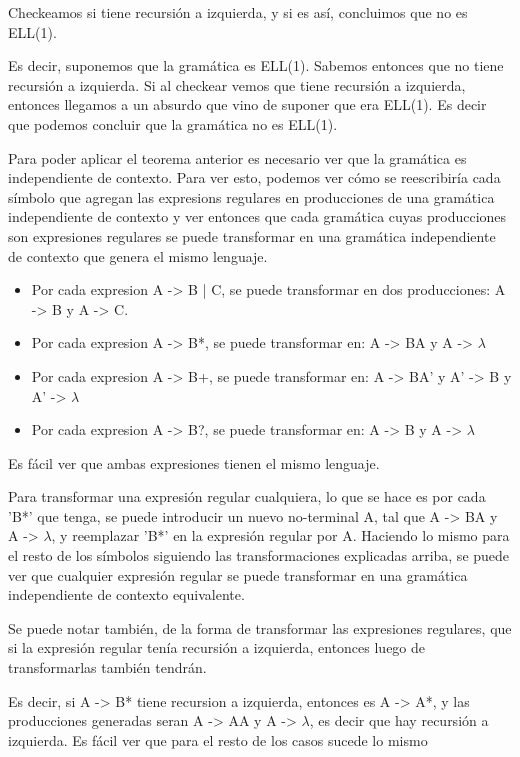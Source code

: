 \documentclass[a4paper]{report}
\begin{document}
Checkeamos si tiene recursión a izquierda, y si es así, concluimos que no es
ELL(1).


Es decir, suponemos que la gramática es ELL(1). Sabemos entonces que no
tiene recursión a izquierda. Si al checkear vemos que tiene recursión a
izquierda, entonces llegamos a un absurdo que vino de suponer que era ELL(1). Es
decir que podemos concluir que la gramática no es ELL(1).


Para poder aplicar el teorema anterior es necesario ver que la gramática es
independiente de contexto. Para ver esto, podemos ver cómo se reescribiría cada
símbolo que agregan las expresions regulares en producciones de una gramática
independiente de contexto y ver entonces que cada gramática cuyas producciones
son expresiones regulares se puede transformar en una gramática independiente de
contexto que genera el mismo lenguaje.

\begin{itemize}
\item Por cada expresion A -> B | C, se puede transformar en dos producciones: A -> B
y A -> C.
\item Por cada expresion A -> B*, se puede transformar en: A -> BA y A -> $\lambda$
\item Por cada expresion A -> B+, se puede transformar en: A -> BA' y A' -> B y A' -> $\lambda$
\item Por cada expresion A -> B?, se puede transformar en: A -> B y A -> $\lambda$
\end{itemize}


Es fácil ver que ambas expresiones tienen el mismo lenguaje.


Para transformar una expresión regular cualquiera, lo que se hace es por cada
'B*' que tenga, se puede introducir un nuevo no-terminal A, tal que A -> BA y A
-> $\lambda$, y reemplazar 'B*' en la expresión regular por A. Haciendo lo mismo para el
resto de los símbolos siguiendo las transformaciones explicadas arriba, se puede
ver que cualquier expresión regular se puede transformar en una gramática
independiente de contexto equivalente.


Se puede notar también, de la forma de transformar las expresiones regulares,
que si la expresión regular tenía recursión a izquierda, entonces luego de
transformarlas también tendrán.


Es decir, si A -> B* tiene recursion a izquierda, entonces es A -> A*, y las
producciones generadas seran A -> AA y A -> $\lambda$, es decir que hay recursión a
izquierda. Es fácil ver que para el resto de los casos sucede lo mismo
\end{document}
